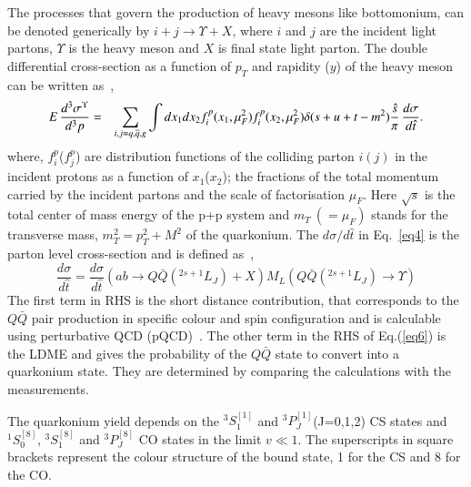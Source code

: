 
The processes that govern the production of heavy mesons like bottomonium,
can be denoted generically by 
$i+j\rightarrow \Upsilon +X$, where $i$ and $j$ are the incident light partons,
$\Upsilon$ is the heavy meson and $X$ is final state light parton.
The double differential cross-section as a function of $p_T$ and rapidity ($y$) of 
the heavy meson can be written as~\cite{Kumar:2016ojy},
\begin{eqnarray}
  E\,\frac{d^3\sigma^{\Upsilon} }{d^3p} &=& \sum_{i,j=q,\overline{q},g} \int dx_1 dx_2 f_{i}^p(x_1,\mu_F^2)
  f_{i}^p(x_2,\mu_F^2) \delta(s+u+t-m^2) {\hat{s} \over \pi} \, \frac{d\sigma}{d\hat{t}}.
  \label{eq4}
\end{eqnarray}
where, $f_{i}^p$($f_{j}^p$) are distribution functions of the colliding parton $i(j)$ in
the incident protons as a function of $x_1$($x_2$); the fractions of the total momentum
carried by the incident partons and the scale of factorisation $\mu_F$.
Here $\sqrt{s}$ is the total center of mass energy of the p+p system and $m_T~(=\mu_F)$ stands for
the transverse mass, $m_T^2=p_T^2 + M^2$ of the quarkonium.
The ${d\sigma}/{d\hat{t}}$ in Eq.~\ref{eq4} is the parton level cross-section and is
defined as~\cite{Bodwin:1994jh},
\begin{equation}
  \frac{d\sigma}{d\hat{t}} = \frac{d\sigma}{d\hat{t}}(ab\rightarrow Q\bar{Q}(^{2s+1}L_J)+X)
  M_L(Q\bar{Q}(^{2s+1}L_J)\rightarrow \Upsilon)
  \label{eq6}
\end{equation}
The first term in RHS is the short distance contribution, that corresponds to the $Q\bar{Q}$
pair production in specific colour and spin configuration and is calculable using 
perturbative QCD (pQCD)~\cite{Braaten:2000cm,Baier:1983va,Humpert:1986cy,Gastmans:1987be,Cho:1995vh,Cho:1995ce}.
The other term in the RHS of Eq.(\ref{eq6}) is the LDME 
and gives the probability of the $Q\bar{Q}$ state to convert into a quarkonium state.
They are determined by comparing the calculations with the measurements.

The quarkonium yield depends on the $^3S_1^{[1]}$ 
and $^3P_J^{[1]}$(J=0,1,2) CS states and $^1S_0^{[8]}$, $^3S_1^{[8]}$ and $^3P_J^{[8]}$
CO states in the limit $v\ll 1$.
The superscripts in square brackets represent the colour structure of the bound state,
1 for the CS and 8 for the CO.



